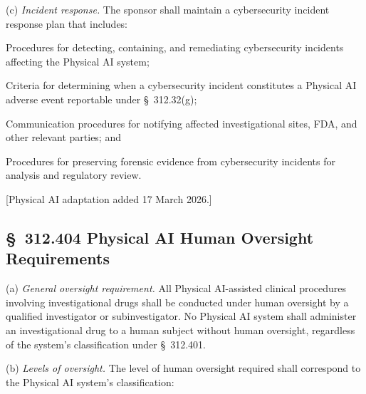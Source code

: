 (c) \textit{Incident response.} The sponsor shall maintain a cybersecurity incident response plan that includes:

\begin{description}[leftmargin=0.8cm,style=sameline]
\item[(1)] Procedures for detecting, containing, and remediating cybersecurity incidents affecting the Physical AI system;
\item[(2)] Criteria for determining when a cybersecurity incident constitutes a Physical AI adverse event reportable under \S~312.32(g);
\item[(3)] Communication procedures for notifying affected investigational sites, FDA, and other relevant parties; and
\item[(4)] Procedures for preserving forensic evidence from cybersecurity incidents for analysis and regulatory review.
\end{description}

[Physical AI adaptation added 17 March 2026.]

\subsection{\S~312.404 Physical AI Human Oversight Requirements}

(a) \textit{General oversight requirement.} All Physical AI-assisted clinical procedures involving investigational drugs shall be conducted under human oversight by a qualified investigator or subinvestigator. No Physical AI system shall administer an investigational drug to a human subject without human oversight, regardless of the system's classification under \S~312.401.

(b) \textit{Levels of oversight.} The level of human oversight required shall correspond to the Physical AI system's classification:


